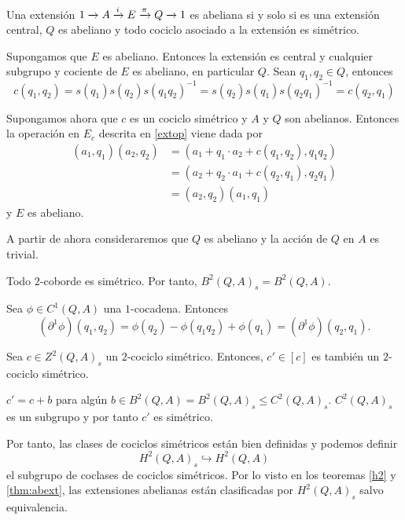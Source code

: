 \begin{teorema}\label{thm:abext}
	Una extensión $\extension i \pi A E Q$ es abeliana si y solo si es una extensión central, $Q$ es abeliano y todo cociclo asociado a la extensión es simétrico.
	\begin{demostracion}
		Supongamos que $E$ es abeliano. Entonces la extensión es central y cualquier subgrupo y cociente de $E$ es abeliano, en particular $Q$. Sean $q_1,q_2\in Q$, entonces
		\begin{equation*}
			c(q_1,q_2)=s(q_1)s(q_2)s(q_1q_2)^{-1} = s(q_2)s(q_1)s(q_2q_1)^{-1} = c(q_2,q_1)
		\end{equation*}
		
		Supongamos ahora que $c$ es un cociclo simétrico y $A$ y $Q$ son abelianos. Entonces la operación en $E_c$ descrita en \ref{extop} viene dada por 
		\begin{align*}
			(a_1,q_1)(a_2,q_2) 
			& = (a_1+q_1\cdot a_2 + c(q_1,q_2),q_1q_2) \\
			& = (a_2 + q_2\cdot a_1 + c(q_2,q_1),q_2q_1) \\
			& = (a_2,q_2)(a_1,q_1)
		\end{align*}
		y $E$ es abeliano.
	\end{demostracion}
\end{teorema}

A partir de ahora consideraremos que $Q$ es abeliano y la acción de $Q$ en $A$ es trivial.

\begin{proposicion}
		Todo $2$-coborde es simétrico. Por tanto, $B^2(Q,A)_s=B^2(Q,A)$.
	\begin{demostracion}
		Sea $\phi\in C^1(Q,A)$ una $1$-cocadena. Entonces
		\begin{equation*}
			(\partial^1\phi)(q_1,q_2) = \phi(q_2) - \phi(q_1q_2) + \phi(q_1) = (\partial^1\phi)(q_2,q_1).
		\end{equation*}
	\end{demostracion}
\end{proposicion}

\begin{corolario}
	Sea $c\in Z^2(Q,A)_s$ un $2$-cociclo simétrico. Entonces, $c'\in [c]$ es también un $2$-cociclo simétrico.
	\begin{demostracion}
		$c' = c+b$ para algún $b\in B^2(Q,A)=B^2(Q,A)_s\leq C^2(Q,A)_s$. $C^2(Q,A)_s$ es un subgrupo y por tanto $c'$ es simétrico.
	\end{demostracion}
\end{corolario}

Por tanto, las clases de cociclos simétricos están bien definidas y podemos definir
	\begin{equation*}
	H^2(Q,A)_s \hookrightarrow H^2(Q,A)
	\end{equation*}
	el subgrupo de coclases de cociclos simétricos. Por lo visto en los teoremas \ref{h2} y \ref{thm:abext}, las extensiones abelianas están clasificadas por $H^2(Q,A)_s$ salvo equivalencia.